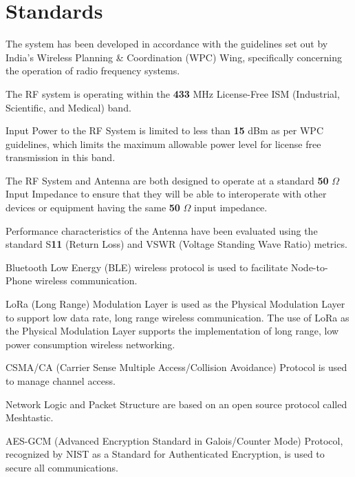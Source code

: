 \chapter{Standards}
\label{Chapter_Standards}

The system has been developed in accordance with the guidelines set out by India's Wireless Planning \& Coordination (WPC) Wing, specifically concerning the operation of radio frequency systems. 

The RF system is operating within the \textbf{433} MHz License-Free ISM (Industrial, Scientific, and Medical) band. 

Input Power to the RF System is limited to less than \textbf{15} dBm as per WPC guidelines, which limits the maximum allowable power level for license free transmission in this band. 

The RF System and Antenna are both designed to operate at a standard \textbf{50} $\Omega$ Input Impedance to ensure that they will be able to interoperate with other devices or equipment having the same \textbf{50} $\Omega$ input impedance. 

Performance characteristics of the Antenna have been evaluated using the standard S\textbf{11} (Return Loss) and VSWR (Voltage Standing Wave Ratio) metrics. 

Bluetooth Low Energy (BLE) wireless protocol is used to facilitate Node-to-Phone wireless communication. 

LoRa (Long Range) Modulation Layer is used as the Physical Modulation Layer to support low data rate, long range wireless communication. The use of LoRa as the Physical Modulation Layer supports the implementation of long range, low power consumption wireless networking. 

CSMA/CA (Carrier Sense Multiple Access/Collision Avoidance) Protocol is used to manage channel access. 

Network Logic and Packet Structure are based on an open source protocol called Meshtastic. 

AES-GCM (Advanced Encryption Standard in Galois/Counter Mode) Protocol, recognized by NIST as a Standard for Authenticated Encryption, is used to secure all communications.
